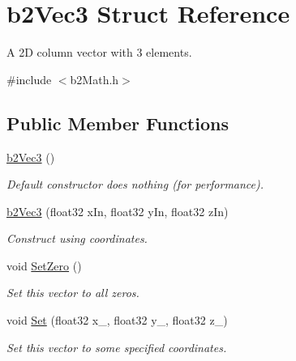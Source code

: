\hypertarget{structb2Vec3}{}\section{b2\+Vec3 Struct Reference}
\label{structb2Vec3}


A 2D column vector with 3 elements.  




{\ttfamily \#include $<$b2\+Math.\+h$>$}

\subsection*{Public Member Functions}
\begin{DoxyCompactItemize}
\item 
\mbox{\label{structb2Vec3_a837423f66d6fb72d815e7390c09938b9}} 
\mbox{\hyperlink{structb2Vec3_a837423f66d6fb72d815e7390c09938b9}{b2\+Vec3}} ()
\begin{DoxyCompactList}\small\item\em Default constructor does nothing (for performance). \end{DoxyCompactList}\item 
\mbox{\label{structb2Vec3_a5db4043a3ea58894562081f1f68195d9}} 
\mbox{\hyperlink{structb2Vec3_a5db4043a3ea58894562081f1f68195d9}{b2\+Vec3}} (float32 x\+In, float32 y\+In, float32 z\+In)
\begin{DoxyCompactList}\small\item\em Construct using coordinates. \end{DoxyCompactList}\item 
\mbox{\label{structb2Vec3_a5a459ed49f1910a347ca247f848a2dd8}} 
void \mbox{\hyperlink{structb2Vec3_a5a459ed49f1910a347ca247f848a2dd8}{Set\+Zero}} ()
\begin{DoxyCompactList}\small\item\em Set this vector to all zeros. \end{DoxyCompactList}\item 
\mbox{\label{structb2Vec3_a12a1bc14bbe722dfb175a492d2d00a79}} 
void \mbox{\hyperlink{structb2Vec3_a12a1bc14bbe722dfb175a492d2d00a79}{Set}} (float32 x\+\_\+, float32 y\+\_\+, float32 z\+\_\+)
\begin{DoxyCompactList}\small\item\em Set this vector to some specified coordinates. \end{DoxyCompactList}\item 

\end{DoxyCompactItemize}

